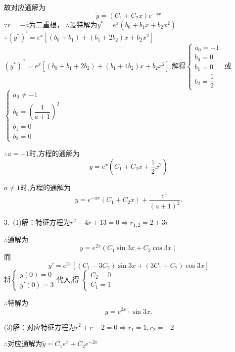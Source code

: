   故对应通解为\[\tilde y = \left( {{C_1} + {C_2}x} \right){e^{ - ax}}\]
  $\because  r =  - a $为二重根，
  $\therefore $设特解为${y^*} = {e^x}\left( {{b_0} + {b_1}x + {b_2}{x^2}} \right)$
  $\therefore {\left( {{y^*}} \right)^\prime } = {e^x}\left[ {\left( {{b_0} + {b_1}} \right) + \left( {{b_1} + 2{b_2}} \right)x + {b_2}{x^2}} \right]$
  ${\left( {{y^*}} \right)^{\prime \prime }} = {e^x}\left[ {\left( {{b_0} + {b_1} + 2{b_2}} \right) + \left( {{b_1} + 4{b_2}} \right)x + {b_2}{x^2}} \right]$
  解得$\begin{cases}
    {{a_0} =  - 1} \\
    {{b_0} = 0} \\
    {{b_1} = 0} \\
    {{b_2} = \dfrac{1}{2}}
  \end{cases}$
  或
  $\begin{cases}
    {{a_0} \ne  - 1} \\
    {{b_0} = {{\left( {\dfrac{1}{{a + 1}}} \right)}^2}} \\
    {{b_1} = 0} \\
    {{b_2} = 0}
  \end{cases}$

  $\therefore a =  - 1$时,方程的通解为\[y = {e^x}\left( {{C_1} + {C_2}x + \frac{1}{2}{x^2}} \right)\]

  $ a \ne 1 $时,方程的通解为\[y = {e^{ - ax}}\left( {{C_1} + {C_2}x} \right) + \frac{{{e^x}}}{{{{\left( {a + 1} \right)}^2}}}.\]

  3.~(1)解：特征方程为${r^2} - 4r + 13 = 0 \Rightarrow {r_{1,2}} = 2 \pm 3i$

  $\therefore $通解为\[y = {e^{2x}}\left( {{C_1}\sin 3x + {C_2}\cos 3x} \right)\]
  而\[y' = {e^{2x}}\left[ {\left( {{C_1} - 3{C_2}} \right)\sin 3x + \left( {3{C_1} + {C_2}} \right)\cos 3x} \right]\]
  将$\begin{cases}
    {y\left( 0 \right) = 0} \\
    {y'\left( 0 \right) = 3}
  \end{cases}$代入,得
  $\begin{cases}
    {{C_2} = 0} \\
    {{C_1} = 1}
  \end{cases}$

  $\therefore $特解为\[y = {e^{2x}} \cdot \sin 3x.\]

  (3)解：对应特征方程为${r^2} + r - 2 = 0 \Rightarrow {r_1} = 1,{r_2} =  - 2$

  $\therefore $对应通解为$\tilde y = {C_1}{e^x} + {C_2}{e^{ - 2x}}$

